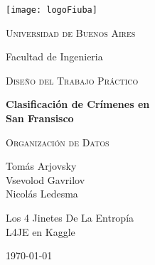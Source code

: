 \begin{titlepage}
  \centering
  \texttt{[image: logoFiuba]}\par\vspace{1cm}
  {\scshape\LARGE{Universidad de Buenos Aires}} \\
  {\Large{Facultad de Ingenieria}\par}
  \vspace{1cm}
  {\scshape\Large Diseño del Trabajo Práctico \par}
  \vspace{1.5cm}
  {\huge\bfseries Clasificación de Crímenes en\\ San Fransisco\par}
  \vspace{2cm}
  {\Large\textsc{Organización de Datos}}
  \vfill
  {Tomás Arjovsky\\ Vsevolod Gavrilov\\ Nicolás Ledesma \par}
  \vspace{1cm}
  {\Large Los 4 Jinetes De La Entropía} \\
  {\textsc L4JE en Kaggle}

  \vfill

  {\large \today\par}
\end{titlepage}
